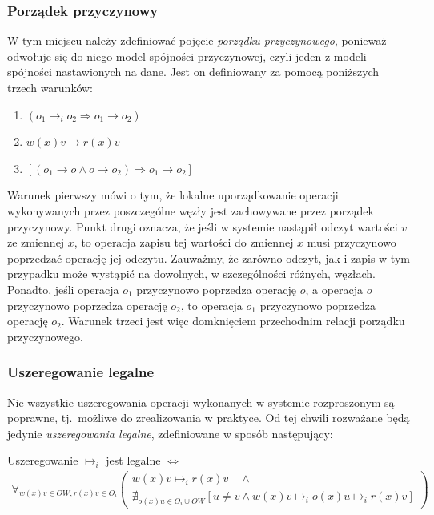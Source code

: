 \subsubsection{Porządek przyczynowy} \label{section:causal_order}

W tym miejscu należy zdefiniować pojęcie \textit{porządku przyczynowego}, ponieważ odwołuje się do niego model spójności przyczynowej, czyli jeden z modeli spójności nastawionych na dane. Jest on definiowany za pomocą poniższych trzech warunków:
\begin{enumerate}
    \item{ 
        $ (o_1 \rightarrow_i o_2 \Rightarrow o_1 \rightarrow o_2) $ }
    \item{
        $ w(x)v \rightarrow r(x)v $ }
    \item{
        $[(o_1 \rightarrow o \wedge o \rightarrow o_2) \Rightarrow o_1 \rightarrow o_2] $ }
\end{enumerate}
Warunek pierwszy mówi o tym, że lokalne uporządkowanie operacji wykonywanych przez poszczególne węzły jest zachowywane przez porządek przyczynowy. Punkt drugi oznacza, że jeśli w systemie nastąpił odczyt wartości $ v $ ze zmiennej $ x $, to operacja zapisu tej wartości do zmiennej $ x $ musi przyczynowo poprzedzać operację jej odczytu. Zauważmy, że zarówno odczyt, jak i zapis w tym przypadku może wystąpić na dowolnych, w szczególności różnych, węzłach. Ponadto, jeśli operacja $ o_1 $ przyczynowo poprzedza operację $ o $, a operacja $ o $ przyczynowo poprzedza operację $ o_2 $, to operacja $ o_1 $ przyczynowo poprzedza operację $ o_2 $. Warunek trzeci jest więc domknięciem przechodnim relacji porządku przyczynowego.

\subsubsection{Uszeregowanie legalne}

Nie wszystkie uszeregowania operacji wykonanych w systemie rozproszonym są poprawne, tj.\ możliwe do zrealizowania w praktyce. Od tej chwili rozważane będą jedynie \textit{uszeregowania legalne}, zdefiniowane w sposób następujący:

Uszeregowanie $ \mapsto_i $ jest legalne $ \Leftrightarrow $
\begin{align*}
    \forall_{w(x)v \in OW, r(x)v \in O_i}
    \left(
    \begin{array}{lr}
         w(x)v \mapsto_i r(x)v \quad \wedge \\
         \nexists_{o(x)u \in O_i \cup OW} [u \neq v \wedge w(x)v \mapsto_i o(x)u \mapsto_i r(x)v]
    \end{array}\right)
\end{align*}

